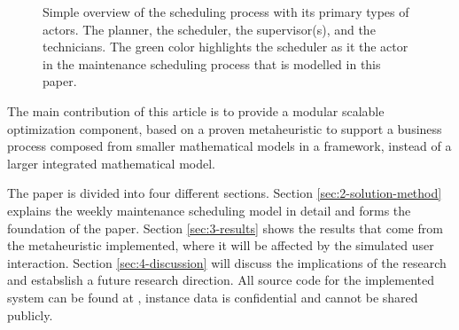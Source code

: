 \begin{figure}
	
	\caption{Simple overview of the scheduling process with its primary types of
		actors. The planner, the scheduler, the supervisor(s), and the technicians. 		
		The green color highlights the scheduler as it the actor in the maintenance
		scheduling process that is modelled in this paper.}
	\label{fig:integrated:maintenance-process}
\end{figure}

The main contribution of this article is to provide a
modular scalable optimization component, based on a proven
metaheuristic to support a business process composed from
smaller mathematical models in a framework, instead of a
larger integrated mathematical model.

The paper is divided into four different sections. Section
\ref{sec:2-solution-method} explains the weekly maintenance scheduling model
in detail and forms the foundation of the paper.  Section \ref{sec:3-results}
shows the results that come from the metaheuristic implemented, where it will
be affected by the simulated user interaction. Section \ref{sec:4-discussion}
will discuss the implications of the research and estabslish a future
research direction. All source code for the implemented system can be found at
\citep{scipo-code-ordinator_api}, instance data is confidential and cannot be
shared publicly.

